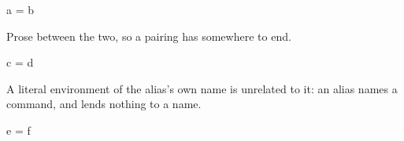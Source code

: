 %
%

\bea
  a = b
\eea

Prose between the two, so a pairing has somewhere to end.

\bea
  c = d
\eea

A literal environment of the alias's own name is unrelated to it: an alias names
a command, and lends nothing to a name.

\begin{bea}
  e = f
\end{bea}
